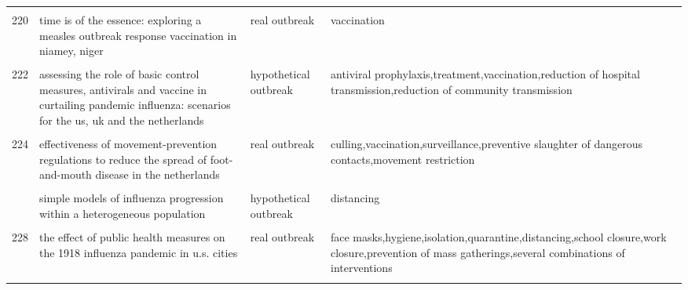 \documentclass[
]{article}
\begin{document}
\begin{landscape}
\begin{longtable}{l>{\raggedright\arraybackslash}p{3cm}l>{\raggedright\arraybackslash}p{8cm}}
\cellcolor{gray!6}{219} & \cellcolor{gray!6}{scenarios of diffusion and control of an influenza pandemic in italy} & \cellcolor{gray!6}{hypothetical outbreak} & \cellcolor{gray!6}{antiviral prophylaxis,distancing,school closure,vaccination,work closure,closure of public places}\\
220 & time is of the essence: exploring a measles outbreak response vaccination in niamey, niger & real outbreak & vaccination\\
\addlinespace
\cellcolor{gray!6}{221} & \cellcolor{gray!6}{a stochastic equation-based model of the value of international air-travel restrictions for controlling pandemic flu} & \cellcolor{gray!6}{hypothetical outbreak} & \cellcolor{gray!6}{travel restriction}\\
222 & assessing the role of basic control measures, antivirals and vaccine in curtailing pandemic influenza: scenarios for the us, uk and the netherlands & hypothetical outbreak & antiviral prophylaxis,treatment,vaccination,reduction of hospital transmission,reduction of community transmission\\
\cellcolor{gray!6}{223} & \cellcolor{gray!6}{deterministic sir (susceptible infected removed) models applied to varicella outbreaks} & \cellcolor{gray!6}{real outbreak} & \cellcolor{gray!6}{isolation,vaccination}\\
224 & effectiveness of movement-prevention regulations to reduce the spread of foot-and-mouth disease in the netherlands & real outbreak & culling,vaccination,surveillance,preventive slaughter of dangerous contacts,movement restriction\\
\cellcolor{gray!6}{225} & \cellcolor{gray!6}{effects of internal border control on spread of pandemic influenza} & \cellcolor{gray!6}{real outbreak} & \cellcolor{gray!6}{travel restriction}\\
\addlinespace
226 & simple models of influenza progression within a heterogeneous population & hypothetical outbreak & distancing\\
\cellcolor{gray!6}{227} & \cellcolor{gray!6}{stochastic model of an influenza epidemic with drug resistance} & \cellcolor{gray!6}{hypothetical outbreak} & \cellcolor{gray!6}{treatment}\\
228 & the effect of public health measures on the 1918 influenza pandemic in u.s. cities & real outbreak & face masks,hygiene,isolation,quarantine,distancing,school closure,work closure,prevention of mass gatherings,several combinations of interventions\\
\cellcolor{gray!6}{229} & \cellcolor{gray!6}{vaccinating in disease-free regions: a vaccine model with application to yellow fever} & \cellcolor{gray!6}{hypothetical outbreak} & \cellcolor{gray!6}{vaccination}\\

\end{longtable}
\end{landscape}
\end{document}
